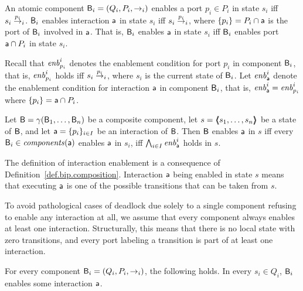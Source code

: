 \begin{definition}\label{def.bip.enablement} 
An atomic component $\B_i = (Q_i,P_i,\goesto_i)$ enables a port $p_i \in P_i$ in state $s_i$ iff $s_i \goesto[p_i]_i$.
$\B_i$ enables interaction $\act$ in state $s_i$ iff $s_i \goesto[p_i]_i$, where $\set{p_i} = P_i \ints \act$ is the port of $\B_i$ involved in $\act$.
That is, $\B_i$ enables $\act$ in state $s_i$ iff $\B_i$ enables port $\act \ints P_i$ in state $s_i$. 

Recall that $\gd{p_i}{i}$ denotes the enablement condition for port $p_i$ in component $\B_i$, that is, $\gd{p_i}{i}$ holds iff
$s_i \goesto[p_i]_i$, where $s_i$ is the current state of $\B_i$.
Let $\gd{\act}{i}$ denote the enablement condition for interaction $\act$ in
component $\B_i$, that is,  $\gd{\act}{i} = \gd{p_i}{i}$ where $\set{p_i} = \act \ints P_i$.  

Let $\B = \gamma(\B_1,\dots,\B_n)$ be a composite component, let
$s = \tpl{s_1,\ldots,s_n}$ be a state of $\B$,
and let $\act = \{p_i\}_{i\in I}$ be an interaction of $\B$.
Then $\B$ enables $\act$ in $s$
iff every $\B_i \in \cmps{\act}$ enables $\act$ in $s_i$, \ie iff
$\AND_{i \in I} \gd{\act}{i}$ holds in $s$.   %
\end{definition}
%
The definition of  interaction enablement is a consequence of 
Definition~\ref{def.bip.composition}. 
Interaction $\act$ being enabled in state $s$ means that executing
$\act$ is one of the possible transitions that can be taken from $s$.

To avoid pathological cases of deadlock due solely to a single component refusing to enable any interaction at all, 
we assume that every component always enables at least one interaction.
Structurally, this means that there is no local state with zero transitions, 
and every port labeling a transition is 
part of at least one interaction. 

\begin{definition} \label{def.bip.local-enablement}
For every component  $\B_i = (Q_i,P_i,\goesto_i)$, the following holds. 
  In every $s_i \in Q_i$, $\B_i$ enables some
interaction $\act$.
\end{definition}

